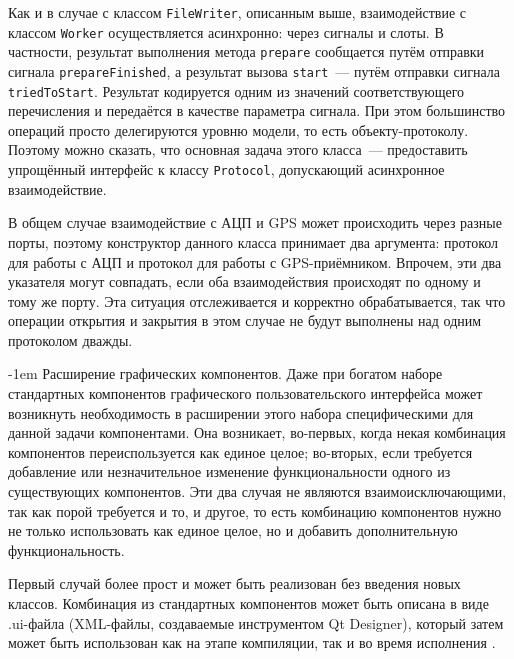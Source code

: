 \documentclass[a4paper, 14pt, titlepage]{extarticle}
\makeatletter
\newcommand{\inlinecode}[1]{\lstinline[basicstyle=\ttfamily]{#1}}
\newcommand{\eng}[1]{\foreignlanguage{english}{#1}}
\renewcommand{\paragraph}{%
    \@startsection{paragraph}{4}%
    {\parindent}{\z@}{-1em}%
    {\normalfont\normalsize\bfseries}%
  }
\makeatother
\begin{document}
  Как и в случае с классом \inlinecode{FileWriter}, описанным выше, взаимодействие с классом
  \inlinecode{Worker} осуществляется асинхронно: через сигналы и слоты. В частности, результат
  выполнения метода \inlinecode{prepare} сообщается путём отправки сигнала
  \inlinecode{prepareFinished}, а результат вызова \inlinecode{start}~--- путём отправки сигнала
  \inlinecode{triedToStart}. Результат кодируется одним из значений соответствующего перечисления и
  передаётся в качестве параметра сигнала. При этом большинство операций просто делегируются уровню
  модели, то есть объекту-протоколу. Поэтому можно сказать, что основная задача этого класса~---
  предоставить упрощённый интерфейс к классу \inlinecode{Protocol}, допускающий асинхронное
  взаимодействие.

  В общем случае взаимодействие с АЦП и GPS может происходить через разные порты, поэтому конструктор
  данного класса принимает два аргумента: протокол для работы с АЦП и протокол для работы с
  GPS-приёмником. Впрочем, эти два указателя могут совпадать, если оба взаимодействия происходят по одному и
  тому же порту. Эта ситуация отслеживается и корректно обрабатывается, так что операции открытия и
  закрытия в этом случае не будут выполнены над одним протоколом дважды.

  \paragraph{Расширение графических компонентов.}
  Даже при богатом наборе стандартных компонентов графического пользовательского интерфейса может
  возникнуть необходимость в расширении этого набора специфическими для данной задачи компонентами.
  Она возникает, во-первых, когда некая комбинация компонентов переиспользуется как единое целое;
  во-вторых, если требуется добавление или незначительное изменение функциональности одного из
  существующих компонентов. Эти два случая не являются взаимоисключающими, так как порой
  требуется и то, и другое, то есть комбинацию компонентов нужно не только использовать как единое
  целое, но и добавить дополнительную функциональность.

  Первый случай более прост и может быть реализован без введения новых классов. Комбинация из
  стандартных компонентов может быть описана в виде .ui-файла (XML-файлы, создаваемые инструментом
  \eng{Qt Designer}), который затем может быть использован как на этапе компиляции, так и во время
  исполнения \cite{qt-ui-file}.
\end{document}
